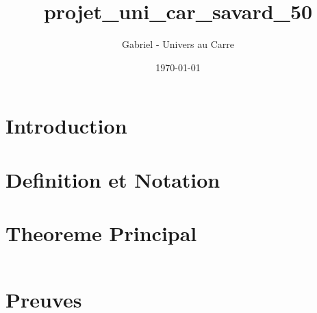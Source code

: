 \documentclass[12pt]{article}
\title{projet_uni_car_savard_50}
\author{Gabriel - Univers au Carre}
\date{\today}
\begin{document}
\maketitle


\section{Introduction}



\section{Definition et Notation}



\section{Theoreme Principal}


\begin{equation}
\end{equation}


\section{Preuves}


\end{document}
